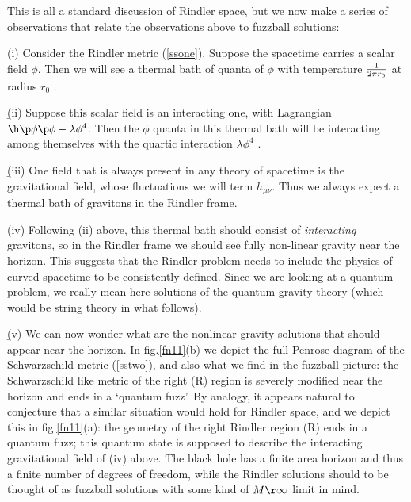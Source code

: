\documentclass[11pt]{article}
\begin{document}
This is all a standard discussion of Rindler space, but we now make a series of observations that relate the observations above to fuzzball solutions:

\b









\b


(i) Consider the Rindler metric (\ref{ssone}). Suppose the spacetime carries  a scalar field $\phi$. Then we will see a thermal bath of quanta of $\phi$ with temperature ${1\over 2\pi r_0}$ at radius $r_0$ \cite{unruh}. 


\b

(ii) Suppose this scalar field is an interacting one, with Lagrangian $\h\p\phi\p\phi-\lambda\phi^4$. Then the $\phi$ quanta in this thermal bath will be interacting among themselves with the quartic interaction $\lambda \phi^4$ \cite{unruh2}. 


\b

(iii) One field that is always present in any theory of spacetime is the gravitational field, whose fluctuations we will term $h_{\mu\nu}$. Thus we always expect a thermal bath of gravitons in the Rindler frame.


\b

(iv) Following (ii) above, this thermal bath should consist of {\it interacting} gravitons, so in the Rindler frame we should see fully non-linear gravity near the horizon. This suggests that the Rindler problem needs to include the physics of curved spacetime to be consistently defined. Since we are looking at a quantum problem, we really mean here solutions of the quantum gravity theory (which would be string theory in what follows). 


\b

(v) We can now wonder what are the nonlinear gravity solutions that should appear near the horizon. In fig.\ref{fn11}(b) we depict the full Penrose diagram of the Schwarzschild metric (\ref{sstwo}), and also what we find in the fuzzball picture: the Schwarzschild like metric of the right (R) region is severely modified near the horizon and ends in a `quantum fuzz'.  By analogy, it appears natural to conjecture that a similar situation would hold for Rindler space, and we depict this in fig.\ref{fn11}(a): the geometry of the right Rindler region (R) ends in a quantum fuzz; this quantum state is supposed to describe the interacting gravitational field of (iv) above. The black hole has a finite area horizon and thus a finite number of degrees of freedom, while the Rindler solutions should to be thought of as fuzzball solutions with some kind of $M\r\infty$ limit in mind. 
\end{document}
